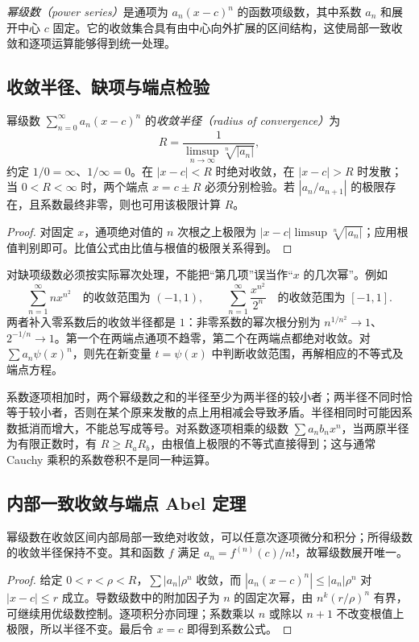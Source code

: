 \emph{幂级数（power series）}是通项为 $a_n(x-c)^n$ 的函数项级数，其中系数 $a_n$ 和展开中心 $c$ 固定。它的收敛集合具有由中心向外扩展的区间结构，这使局部一致收敛和逐项运算能够得到统一处理。

\subsection{收敛半径、缺项与端点检验}

\begin{theorem}
\label{thm:pei-radius}
幂级数 $\sum_{n=0}^{\infty}a_n(x-c)^n$ 的\emph{收敛半径（radius of convergence）}为
\[
 R=\frac1{\limsup_{n\to\infty}\sqrt[n]{|a_n|}},
\]
约定 $1/0=\infty$、$1/\infty=0$。在 $|x-c|<R$ 时绝对收敛，在 $|x-c|>R$ 时发散；当 $0<R<\infty$ 时，两个端点 $x=c\pm R$ 必须分别检验。若 $|a_n/a_{n+1}|$ 的极限存在，且系数最终非零，则也可用该极限计算 $R$。
\end{theorem}
\begin{proof}
对固定 $x$，通项绝对值的 $n$ 次根之上极限为 $|x-c|\limsup\sqrt[n]{|a_n|}$；应用根值判别即可。比值公式由比值与根值的极限关系得到。
\end{proof}

对缺项级数必须按实际幂次处理，不能把“第几项”误当作“$x$ 的几次幂”。例如
\[
 \sum_{n=1}^{\infty}nx^{n^2}
 \quad\text{的收敛范围为 }(-1,1),\qquad
 \sum_{n=1}^{\infty}\frac{x^{n^2}}{2^n}
 \quad\text{的收敛范围为 }[-1,1].
\]
两者补入零系数后的收敛半径都是 $1$：非零系数的幂次根分别为 $n^{1/n^2}\to1$、$2^{-1/n}\to1$。第一个在两端点通项不趋零，第二个在两端点都绝对收敛。对 $\sum a_n\psi(x)^n$，则先在新变量 $t=\psi(x)$ 中判断收敛范围，再解相应的不等式及端点方程。

系数逐项相加时，两个幂级数之和的半径至少为两半径的较小者；两半径不同时恰等于较小者，否则在某个原来发散的点上用相减会导致矛盾。半径相同时可能因系数抵消而增大，不能总写成等号。对系数逐项相乘的级数 $\sum a_nb_nx^n$，当两原半径为有限正数时，有 $R\geq R_aR_b$，由根值上极限的不等式直接得到；这与通常 Cauchy 乘积的系数卷积不是同一种运算。

\subsection{内部一致收敛与端点 Abel 定理}

\begin{proposition}
\label{prop:pei-power-interior}
幂级数在收敛区间内部局部一致绝对收敛，可以任意次逐项微分和积分；所得级数的收敛半径保持不变。其和函数 $f$ 满足 $a_n=f^{(n)}(c)/n!$，故幂级数展开唯一。
\end{proposition}
\begin{proof}
给定 $0<r<\rho<R$，$\sum|a_n|\rho^n$ 收敛，而 $|a_n(x-c)^n|\leq|a_n|\rho^n$ 对 $|x-c|\leq r$ 成立。导数级数中的附加因子为 $n$ 的固定次幂，由 $n^k(r/\rho)^n$ 有界，可继续用优级数控制。逐项积分亦同理；系数乘以 $n$ 或除以 $n+1$ 不改变根值上极限，所以半径不变。最后令 $x=c$ 即得到系数公式。
\end{proof}

